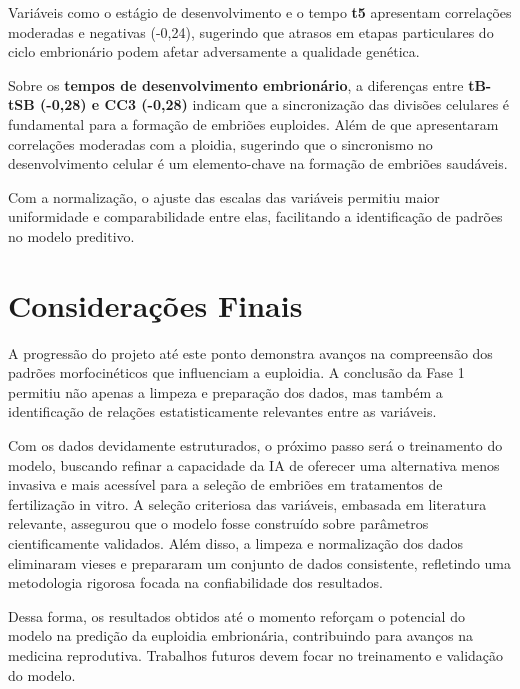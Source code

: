 Variáveis como o estágio de desenvolvimento e o tempo \textbf{t5} apresentam correlações moderadas e negativas (-0,24), sugerindo que atrasos em etapas particulares do ciclo embrionário podem afetar adversamente a qualidade genética.

Sobre os \textbf{tempos de desenvolvimento embrionário}, a diferenças entre \textbf{tB-tSB (-0,28) e CC3 (-0,28)} indicam que a sincronização das divisões celulares é fundamental para a formação de embriões euploides. Além de que apresentaram correlações moderadas com a ploidia, sugerindo que o sincronismo no desenvolvimento celular é um elemento-chave na formação de embriões saudáveis.

Com a normalização, o ajuste das escalas das variáveis permitiu maior uniformidade e comparabilidade entre elas, facilitando a identificação de padrões no modelo preditivo.

\section{Considerações Finais}

A progressão do projeto até este ponto demonstra avanços na compreensão dos padrões morfocinéticos que influenciam a euploidia. A conclusão da Fase 1 permitiu não apenas a limpeza e preparação dos dados, mas também a identificação de relações estatisticamente relevantes entre as variáveis.

Com os dados devidamente estruturados, o próximo passo será o treinamento do modelo, buscando refinar a capacidade da IA de oferecer uma alternativa menos invasiva e mais acessível para a seleção de embriões em tratamentos de fertilização in vitro. A seleção criteriosa das variáveis, embasada em literatura relevante, assegurou que o modelo fosse construído sobre parâmetros cientificamente validados. Além disso, a limpeza e normalização dos dados eliminaram vieses e prepararam um conjunto de dados consistente, refletindo uma metodologia rigorosa focada na confiabilidade dos resultados.

Dessa forma, os resultados obtidos até o momento reforçam o potencial do modelo na predição da euploidia embrionária, contribuindo para avanços na medicina reprodutiva. Trabalhos futuros devem focar no treinamento e validação do modelo.